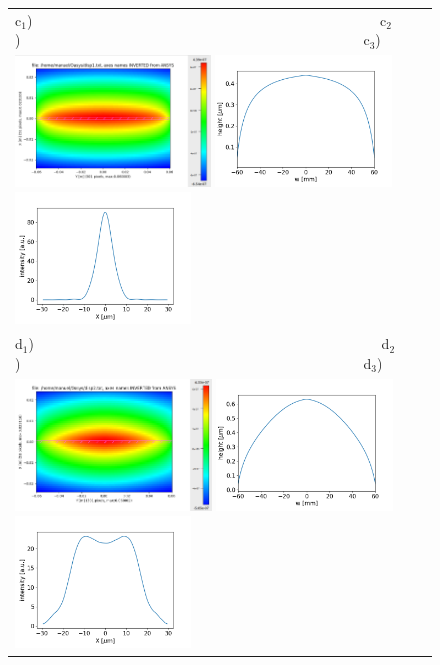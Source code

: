 \documentclass[]{spie}  %
\begin{document}
\begin{figure} [ht]
\begin{center}
\begin{tabular}{l}
   c$_1$)~~~~~~~~~~~~~~~~~~~~~~~~~~~~~~~~~~~~~~~~~~~~~~~~~
   c$_2$)~~~~~~~~~~~~~~~~~~~~~~~~~~~~~~~~~~~~~~~~~~~~~~~~~c$_3$)\\ 
   \includegraphics[height=3.5cm]{figures/water1_2d.png}
   \includegraphics[height=3.5cm]{figures/deformationwater1_1d.png}   
   \includegraphics[height=3.5cm]{figures/intensitywater1.png} \\

   
   d$_1$)~~~~~~~~~~~~~~~~~~~~~~~~~~~~~~~~~~~~~~~~~~~~~~~~~
   d$_2$)~~~~~~~~~~~~~~~~~~~~~~~~~~~~~~~~~~~~~~~~~~~~~~~~~d$_3$)\\
   \includegraphics[height=3.5cm]{figures/water2_2d.png} 
   \includegraphics[height=3.5cm]{figures/deformationwater2_1d.png} 
   \includegraphics[height=3.5cm]{figures/intensitywater2.png}\\
   

\end{tabular}
\end{center}
\end{figure}
\end{document}
